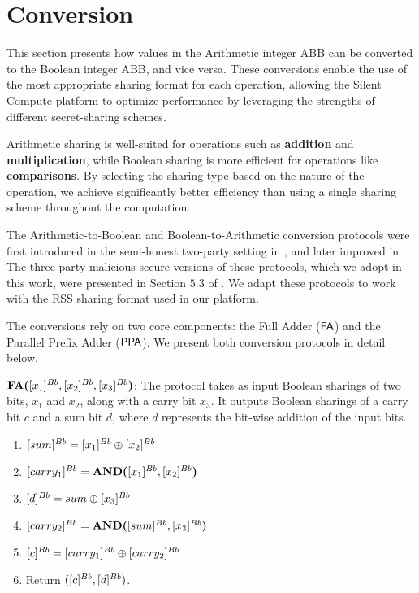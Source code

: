 \section{Conversion}

This section presents how values in the Arithmetic integer ABB can be converted to the Boolean integer ABB, and vice versa.
These conversions enable the use of the most appropriate sharing format for each operation, allowing the Silent Compute platform to optimize performance by leveraging the strengths of different secret-sharing schemes.

Arithmetic sharing is well-suited for operations such as {\bf addition} and {\bf multiplication}, while Boolean sharing is more efficient for operations like {\bf comparisons}.
By selecting the sharing type based on the nature of the operation, we achieve significantly better efficiency than using a single sharing scheme throughout the computation.

The Arithmetic-to-Boolean and Boolean-to-Arithmetic conversion protocols were first introduced in the semi-honest two-party setting in \cite{NDSS:DemSchZoh15}, and later improved in \cite{USENIX:PSSY21}.
The three-party malicious-secure versions of these protocols, which we adopt in this work, were presented in Section $5.3$ of \cite{CCS:MohRin18}.
We adapt these protocols to work with the RSS sharing format used in our platform.

The conversions rely on two core components: the Full Adder ($\mathsf{FA}$) and the Parallel Prefix Adder ($\mathsf{PPA}$). We present both conversion protocols in detail below.

\begin{protocol}
	$\textbf{FA(}[x_1]^{Bb},[x_2]^{Bb},[x_3]^{Bb}\textbf{)}$:
    The protocol takes as input Boolean sharings of two bits, $x_1$ and $x_2$, along with a carry bit $x_3$.
    It outputs Boolean sharings of a carry bit $c$ and a sum bit $d$, where $d$ represents the bit-wise addition of the input bits.
    \begin{enumerate}
        \item $[sum]^{Bb} = [x_1]^{Bb} \oplus [x_2]^{Bb}$
        \item $[carry_1]^{Bb} = \textbf{AND(}[x_1]^{Bb},[x_2]^{Bb}\textbf{)}$
        \item $[d]^{Bb} = sum \oplus [x_3]^{Bb}$
        \item $[carry_2]^{Bb} = \textbf{AND(}[sum]^{Bb},[x_3]^{Bb}\textbf{)}$
        \item $[c]^{Bb} = [carry_1]^{Bb} \oplus [carry_2]^{Bb}$
        \item Return $([c]^{Bb}, [d]^{Bb})$.
    \end{enumerate}
\end{protocol}

